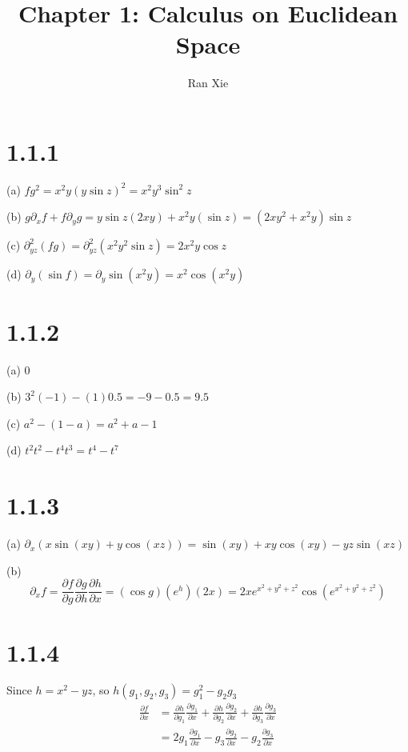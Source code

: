 \documentclass[12pt]{article}
\title{Chapter 1: Calculus on Euclidean Space}
\author{Ran Xie}
\begin{document}
\maketitle

\section*{1.1.1}
(a) $fg^2 = x^2y(y\sin z)^2 = x^2y^3 \sin^2 z$

(b) $g \partial_x f + f \partial_y g = y \sin z (2xy) + x^2y (\sin z)= (2xy^2 + x^2y)\sin z$

(c) $\partial^2_{yz} (fg) =\partial^2_{yz} (x^2y^2\sin z) = 2x^2 y \cos z $

(d) $\partial_y (\sin f) =\partial_y \sin (x^2y) = x^2 \cos(x^2y) $

\section*{1.1.2}
(a) $0$

(b) $3^2(-1)- (1) 0.5 = -9 - 0.5 = 9.5$

(c) $a^2 -(1-a) = a^2 + a - 1$

(d) $t^2 t^2 - t^4 t^3 = t^4-t^7$

\section*{1.1.3}
(a) $\partial_x (x\sin (xy) + y \cos (xz)) = \sin(xy) + xy\cos(xy) - yz\sin(xz)$

(b) $$\partial_x f = \frac{\partial f}{\partial g}\frac{\partial g}{\partial h}\frac{\partial h}{\partial x} = (\cos g)(e^h)(2x)= 2xe^{x^2+y^2+z^2}\cos(e^{x^2+y^2+z^2}) $$

\section*{1.1.4}

Since $h = x^2- yz$, so $h(g_1, g_2, g_3) = g_1^2 - g_2g_3 $
$$\begin{aligned}
	\frac{\partial f}{\partial x} &=\frac{\partial h}{\partial g_1}\frac{\partial g_1}{\partial x} + \frac{\partial h}{\partial g_2}\frac{\partial g_2}{\partial x} + \frac{\partial h}{\partial g_3}\frac{\partial g_3}{\partial x} \\
	&= 2g_1\frac{\partial g_1}{\partial x} -g_3 \frac{\partial g_2}{\partial x} -g_2 \frac{\partial g_3}{\partial x}
\end{aligned} $$
\end{document}
